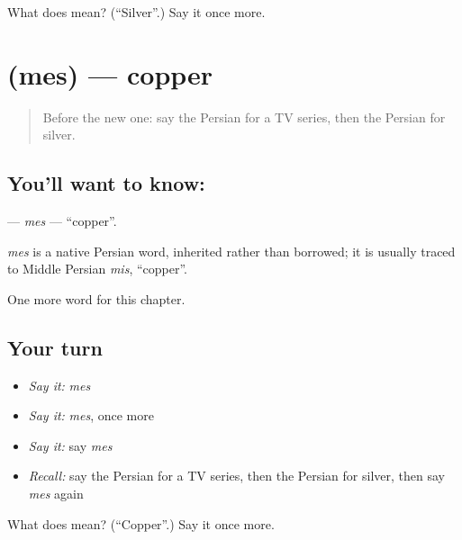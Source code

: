 \begin{tcolorbox}[breakable,colback=teal!4,colframe=teal!35!black,title={Before you move on}]
What does  mean? (\textquotedblleft{}Silver\textquotedblright{}.) Say it once more.
\end{tcolorbox}
\section[\texorpdfstring{\fa{مس} (mes)}{مس (mes)}]{ (mes) — copper}

\label{lesson:FA-C173-mes}



\begin{quote}
Before the new one: say the Persian for a TV series, then the Persian for silver.
\end{quote}

\subsection*{You'll want to know: }
\textbf{} — \emph{mes} — \textquotedblleft{}copper\textquotedblright{}.

\begin{cousinweb}
\emph{mes} is a native Persian word, inherited rather than borrowed; it is usually traced to Middle Persian \emph{mis}, \textquotedblleft{}copper\textquotedblright{}.
\end{cousinweb}

\begin{grammarlens}[title={What you've built}]
One more word for this chapter.
\end{grammarlens}

\subsection*{Your turn}
\begin{itemize}
\raggedright
  \item \emph{Say it:} \emph{mes}
  \item \emph{Say it:} \emph{mes}, once more
  \item \emph{Say it:} say \emph{mes}
  \item \emph{Recall:} say the Persian for a TV series, then the Persian for silver, then say \emph{mes} again
\end{itemize}

\begin{tcolorbox}[breakable,colback=teal!4,colframe=teal!35!black,title={Before you move on}]
What does  mean? (\textquotedblleft{}Copper\textquotedblright{}.) Say it once more.
\end{tcolorbox}
